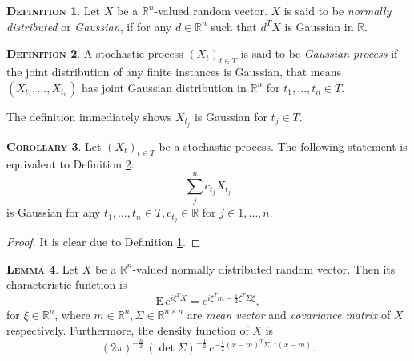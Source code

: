 \documentclass[a4paper, twoside, 11pt]{article}
\theoremstyle{definition}
\newtheorem{definition}{\scshape Definition}[section]
\newtheorem{lemma}[definition]{\scshape Lemma}
\newtheorem{corollary}[definition]{\scshape Corollary}
\begin{document}
  \begin{definition}
	  Let $X$ be a $\mathbb{R}^{n}$-valued random vector. $X$ is said to be \emph{normally distributed} or \emph{Gaussian}, if for any $d \in \mathbb{R}^{n}$ such that $d^TX$ is Gaussian in $\mathbb{R}$.
	  \label{sec:g1}
	\end{definition}

	\begin{definition}
	A stochastic process $(X_t)_{t\in T}$ is said to be \emph{Gaussian process} if the joint distribution of any finite instances is Gaussian, that means
  $
  (X_{t_1},\dots, X_{t_n})
  $ has joint Gaussian distribution in $\mathbb{R}^n$ for $t_1,\dots,t_n \in T$.
  \label{sec:defgau}
  \end{definition}
  The definition immediately shows $X_{t_j}$ is Gaussian for $t_j \in T$.

  \begin{corollary}
	Let $(X_t)_{t\in T}$ be a stochastic process. The following statement is \\equivalent to Definition \ref{sec:defgau}:
	\begin{equation*}
	  \sum_j^n c_{t_j} X_{t_j}
	\end{equation*}
	is Gaussian for any $t_1,\dots,t_n \in T, c_{t_j} \in \mathbb{R}$ for $j\in {1,\dots,n}$.
	\label{sec:gauss}
  \end{corollary}
  \begin{proof}
	It is clear due to Definition \ref{sec:g1}.
  \end{proof}

  \begin{lemma}
	Let $X$ be a $\mathbb{R}^{n}$-valued normally distributed random vector. Then its characteristic function is 
	\begin{equation}
	  \mathrm{E}\,e^{i\xi^TX} = e^{i\xi^Tm - \frac{1}{2}\xi^T \Sigma \xi},
	  \label{sec:mcf}
	\end{equation}
   for $\xi \in \mathbb{R}^{n}$, where $m \in \mathbb{R}^{n}, \Sigma \in \mathbb{R}^{n\times n}$ are \emph{mean vector} and \emph{covariance matrix} of $X$ \\respectively. Furthermore, the density function of $X$ is
  \begin{equation}
	(2\pi)^{-\frac{n}{2}}\, (\det\Sigma) ^{-\frac{1}{2}}\,e^{-\frac{1}{2}(x-m)^T\Sigma^{-1}(x-m)}.
	\label{sec:dsy}
  \end{equation}
  \end{lemma}
\end{document}
